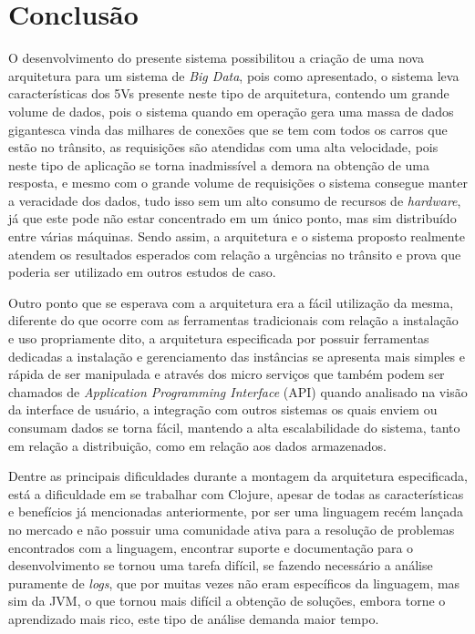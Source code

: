 \chapter{Conclusão}
\label{chap:conclusao}
O desenvolvimento do presente sistema possibilitou a criação de uma nova arquitetura para um sistema de \textit{Big Data}, pois como apresentado, o sistema leva características dos 5Vs presente neste tipo de arquitetura, contendo um grande volume de dados, pois o sistema quando em operação gera uma massa de dados gigantesca vinda das milhares de conexões que se tem com todos os carros que estão no trânsito, as requisições são atendidas com uma alta velocidade, pois neste tipo de aplicação se torna inadmissível a demora na obtenção de uma resposta, e mesmo com o grande volume de requisições o sistema consegue manter a veracidade dos dados, tudo isso sem um alto consumo de recursos de \textit{hardware}, já que este pode não estar concentrado em um único ponto, mas sim distribuído entre várias máquinas. Sendo assim, a arquitetura e o sistema proposto realmente atendem os resultados esperados com relação a urgências no trânsito e prova que poderia ser utilizado em outros estudos de caso.

Outro ponto que se esperava com a arquitetura era a fácil utilização da mesma, diferente do que ocorre com as ferramentas tradicionais com relação a instalação e uso propriamente dito, a arquitetura especificada por possuir ferramentas dedicadas a instalação e gerenciamento das instâncias se apresenta mais simples e rápida de ser manipulada e através dos micro serviços que também podem ser chamados de \textit{Application Programming Interface} (API) quando analisado na visão da interface de usuário, a integração com outros sistemas os quais enviem ou consumam dados se torna fácil, mantendo a alta escalabilidade do sistema, tanto em relação a distribuição, como em relação aos dados armazenados.

Dentre as principais dificuldades durante a montagem da arquitetura especificada, está a dificuldade em se trabalhar com Clojure, apesar de todas as características e benefícios já mencionadas anteriormente, por ser uma linguagem recém lançada no mercado e não possuir uma comunidade ativa para a resolução de problemas encontrados com a linguagem, encontrar suporte e documentação para o desenvolvimento se tornou uma tarefa difícil, se fazendo necessário a análise puramente de \textit{logs}, que por muitas vezes não eram específicos da linguagem, mas sim da JVM, o que tornou mais difícil a obtenção de soluções, embora torne o aprendizado mais rico, este tipo de análise demanda maior tempo.

